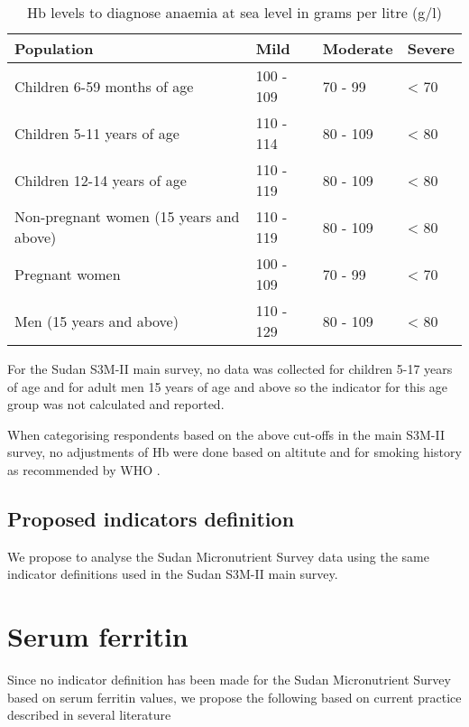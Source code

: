 \documentclass[12pt,a4paper]{article}
\begin{document}
\begin{table}[H]

\caption{\label{tab:hb1}Hb levels to diagnose anaemia at sea level in grams per litre (g/l)}
\centering
\begin{tabular}[t]{llll}
\toprule
\textbf{Population} & \textbf{Mild} & \textbf{Moderate} & \textbf{Severe}\\
\midrule
\rowcolor{gray!6}  Children 6-59 months of age & 100 - 109 & 70 - 99 & < 70\\
Children 5-11 years of age & 110 - 114 & 80 - 109 & < 80\\
\rowcolor{gray!6}  Children 12-14 years of age & 110 - 119 & 80 - 109 & < 80\\
Non-pregnant women
(15 years and above) & 110 - 119 & 80 - 109 & < 80\\
\rowcolor{gray!6}  Pregnant women & 100 - 109 & 70 - 99 & < 70\\
\addlinespace
Men
(15 years and above) & 110 - 129 & 80 - 109 & < 80\\
\bottomrule
\end{tabular}
\end{table}

For the Sudan S3M-II main survey, no data was collected for children 5-17 years of age and for adult men 15 years of age and above so the indicator for this age group was not calculated and reported.

When categorising respondents based on the above cut-offs in the main S3M-II survey, no adjustments of Hb were done based on altitute and for smoking history as recommended by WHO \citep{WorldHealthOrganization:2007tx, WorldHealthOrganization:2011ut}.

\hypertarget{proposed-indicators-definition}{%
\subsection{Proposed indicators definition}\label{proposed-indicators-definition}}

We propose to analyse the Sudan Micronutrient Survey data using the same indicator definitions used in the Sudan S3M-II main survey.

\hypertarget{serum-ferritin}{%
\section{Serum ferritin}\label{serum-ferritin}}

Since no indicator definition has been made for the Sudan Micronutrient Survey based on serum ferritin values, we propose the following based on current practice described in several literature \citep{WorldHealthOrganization:2007tx, Gorstein:2007wn, Wegmuller:2020bw, Thurnham:2010he}
\end{document}

